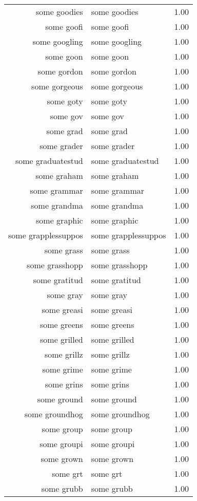 \begin{table}[ht]
\begin{tabular}{rlr}
  some goodies & some goodies & 1.00 \\ 
  some goofi & some goofi & 1.00 \\ 
  some googling & some googling & 1.00 \\ 
  some goon & some goon & 1.00 \\ 
  some gordon & some gordon & 1.00 \\ 
  some gorgeous & some gorgeous & 1.00 \\ 
  some goty & some goty & 1.00 \\ 
  some gov & some gov & 1.00 \\ 
  some grad & some grad & 1.00 \\ 
  some grader & some grader & 1.00 \\ 
  some graduatestud & some graduatestud & 1.00 \\ 
  some graham & some graham & 1.00 \\ 
  some grammar & some grammar & 1.00 \\ 
  some grandma & some grandma & 1.00 \\ 
  some graphic & some graphic & 1.00 \\ 
  some grapplessuppos & some grapplessuppos & 1.00 \\ 
  some grass & some grass & 1.00 \\ 
  some grasshopp & some grasshopp & 1.00 \\ 
  some gratitud & some gratitud & 1.00 \\ 
  some gray & some gray & 1.00 \\ 
  some greasi & some greasi & 1.00 \\ 
  some greens & some greens & 1.00 \\ 
  some grilled & some grilled & 1.00 \\ 
  some grillz & some grillz & 1.00 \\ 
  some grime & some grime & 1.00 \\ 
  some grins & some grins & 1.00 \\ 
  some ground & some ground & 1.00 \\ 
  some groundhog & some groundhog & 1.00 \\ 
  some group & some group & 1.00 \\ 
  some groupi & some groupi & 1.00 \\ 
  some grown & some grown & 1.00 \\ 
  some grt & some grt & 1.00 \\ 
  some grubb & some grubb & 1.00 \\ 

\end{tabular}
\end{table}
